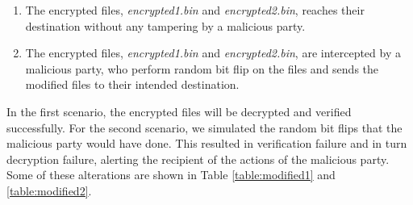 \documentclass{article}
\begin{document}
\begin{enumerate}
    \item The encrypted files, \textit{encrypted1.bin} and \textit{encrypted2.bin}, reaches their destination without any tampering by a malicious party.
    \item The encrypted files, \textit{encrypted1.bin} and \textit{encrypted2.bin}, are intercepted by a malicious party, who perform random bit flip on the files and sends the modified files to their intended destination.
\end{enumerate}
In the first scenario, the encrypted files will be decrypted and verified successfully. For the second scenario, we simulated the random bit flips that the malicious party would have done. This resulted in verification failure and in turn decryption failure, alerting the recipient of the actions of the malicious party. Some of these alterations are shown in Table \ref{table:modified1} and \ref{table:modified2}.
\end{document}
